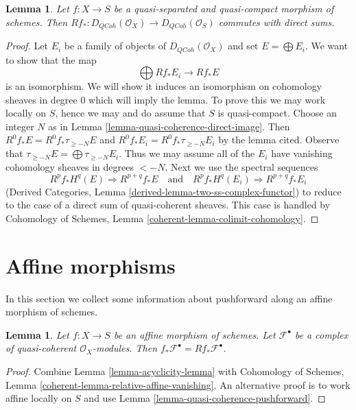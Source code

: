 \documentclass{stacks-project}
\theoremstyle{plain}
\newtheorem{lemma}[subsection]{Lemma}
\theoremstyle{definition}
\theoremstyle{remark}
\numberwithin{equation}{subsection}
\def\QCoh{\mathit{QCoh}}
\begin{document}
\begin{lemma}
\label{lemma-quasi-coherence-pushforward-direct-sums}
Let $f : X \to S$ be a quasi-separated and quasi-compact morphism of
schemes. Then
$Rf_* : D_\QCoh(\mathcal{O}_X) \to D_\QCoh(\mathcal{O}_S)$
commutes with direct sums.
\end{lemma}

\begin{proof}
Let $E_i$ be a family of objects of $D_\QCoh(\mathcal{O}_X)$
and set $E = \bigoplus E_i$. We want to show that the map
$$
\bigoplus Rf_*E_i \longrightarrow Rf_*E
$$
is an isomorphism. We will show it induces an isomorphism on
cohomology sheaves in degree $0$ which will imply the lemma.
To prove this we may work locally on $S$, hence we may and do
assume that $S$ is quasi-compact.
Choose an integer $N$ as in Lemma \ref{lemma-quasi-coherence-direct-image}.
Then $R^0f_*E = R^0f_*\tau_{\geq -N}E$ and
$R^0f_*E_i = R^0f_*\tau_{\geq -N}E_i$ by the lemma cited. Observe that
$\tau_{\geq -N}E = \bigoplus \tau_{\geq -N}E_i$.
Thus we may assume all of the $E_i$ have vanishing cohomology
sheaves in degrees $< -N$. Next we use the spectral sequences
$$
R^pf_*H^q(E) \Rightarrow R^{p + q}f_*E
\quad\text{and}\quad
R^pf_*H^q(E_i) \Rightarrow R^{p + q}f_*E_i
$$
(Derived Categories, Lemma \ref{derived-lemma-two-ss-complex-functor})
to reduce to the case of a direct sum of quasi-coherent sheaves.
This case is handled by
Cohomology of Schemes, Lemma \ref{coherent-lemma-colimit-cohomology}.
\end{proof}









\section{Affine morphisms}
\label{section-affine-morphisms}

\noindent
In this section we collect some information about pushforward
along an affine morphism of schemes.

\begin{lemma}
\label{lemma-pushforward-affine-morphism}
Let $f : X \to S$ be an affine morphism of schemes. Let $\mathcal{F}^\bullet$
be a complex of quasi-coherent $\mathcal{O}_X$-modules. Then
$f_*\mathcal{F}^\bullet = Rf_*\mathcal{F}^\bullet$.
\end{lemma}

\begin{proof}
Combine Lemma \ref{lemma-acyclicity-lemma} with
Cohomology of Schemes, Lemma \ref{coherent-lemma-relative-affine-vanishing}.
An alternative proof is to work affine locally on $S$
and use Lemma \ref{lemma-quasi-coherence-pushforward}.
\end{proof}
\end{document}

